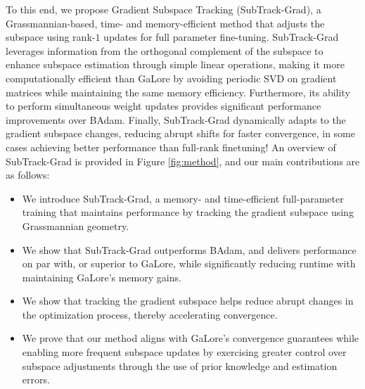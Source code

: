 To this end, we propose Gradient Subspace Tracking (SubTrack-Grad), a Grassmannian-based, time- and memory-efficient method that adjusts the subspace using rank-\(1\) updates for full parameter fine-tuning. SubTrack-Grad leverages information from the orthogonal complement of the subspace to enhance subspace estimation through simple linear operations, making it more computationally efficient than GaLore by avoiding periodic SVD on gradient matrices while maintaining the same memory efficiency. Furthermore, its ability to perform simultaneous weight updates provides significant performance improvements over BAdam. Finally, SubTrack-Grad dynamically adapts to the gradient subspace changes, reducing abrupt shifts for faster convergence, in some cases achieving better performance than full-rank finetuning! An overview of SubTrack-Grad is provided in Figure \ref{fig:method}, and our main contributions are as follows:
\begin{itemize}
    \item We introduce SubTrack-Grad, a memory- and time-efficient full-parameter training that maintains performance by tracking the gradient subspace using Grassmannian geometry.
    \item We show that SubTrack-Grad outperforms BAdam, and delivers performance on par with, or superior to GaLore, while significantly reducing runtime with maintaining GaLore's memory gains. 
    \item We show that tracking the gradient subspace helps reduce abrupt changes in the optimization process, thereby accelerating convergence.
    \item We prove that our method aligns with GaLore's convergence guarantees while enabling more frequent subspace updates by exercising greater control over subspace adjustments through the use of prior knowledge and estimation errors.
\end{itemize}


